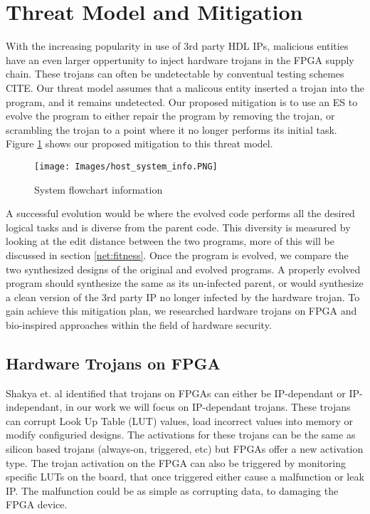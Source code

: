 \documentclass[conference]{IEEEtran}
\begin{document}
\section{Threat Model and Mitigation}
\par With the increasing popularity in use of 3rd party HDL IPs, malicious entities have an even larger oppertunity to inject hardware trojans in the FPGA supply chain.
These trojans can often be undetectable by conventual testing schemes CITE.
Our threat model assumes that a malicous entity inserted a trojan into the program, and it remains undetected.
Our proposed mitigation is to use an ES to evolve the program to either repair the program by removing the trojan, or scrambling the trojan to a point where it no longer performs its initial task.
Figure \ref{fig:network} shows our proposed mitigation to this threat model.

\begin{figure}[t]
    \centering
    \texttt{[image: Images/host\_system\_info.PNG]}
    \caption{System flowchart information} %
    \label{fig:network}
\end{figure}

A successful evolution would be where the evolved code performs all the desired logical tasks and is diverse from the parent code.
This diversity is measured by looking at the edit distance between the two programs, more of this will be discussed in section \ref{net:fitness}.
Once the program is evolved, we compare the two synthesized designs of the original and evolved programs. 
A properly evolved program should synthesize the same as its un-infected parent, or would synthesize a clean version of the 3rd party IP no longer infected by the hardware trojan.
To gain achieve this mitigation plan, we researched hardware trojans on FPGA and bio-inspired approaches within the field of hardware security.

\subsection{Hardware Trojans on FPGA}
\label{wbd:trojans}
\par Shakya et. al\cite{benchmarking of hardware trojans and malicous} identified that trojans on FPGAs can either be IP-dependant or IP-independant, in our work we will focus on IP-dependant trojans.
These trojans can corrupt Look Up Table (LUT) values, load incorrect values into memory or modify configuried designs. 
The activations for these trojans can be the same as silicon based trojans (always-on, triggered, etc) but FPGAs offer a new activation type\cite{novel feature extraction strategy for hardware torjan detection, benchmarking of hardware trojans and malicous}.
The trojan activation on the FPGA can also be triggered by monitoring specific LUTs on the board, that once triggered either cause a malfunction or leak IP.
The malfunction could be as simple as corrupting data, to damaging the FPGA device.
\end{document}
